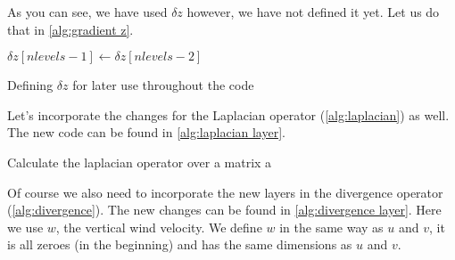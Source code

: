 As you can see, we have used $\delta z$ however, we have not defined it yet. Let us do that in \autoref{alg:gradient z}.

\begin{algorithm}[hbt]
    $\delta z[nlevels - 1] \leftarrow \delta z [nlevels - 2]$ \;
    \caption{Defining $\delta z$ for later use throughout the code}
    \label{alg:gradient z}
\end{algorithm}

Let's incorporate the changes for the Laplacian operator (\autoref{alg:laplacian}) as well. The new code can be found in \autoref{alg:laplacian layer}.

\begin{algorithm}[hbt]
    
     \;
    \caption{Calculate the laplacian operator over a matrix a}
    \label{alg:laplacian layer}
\end{algorithm}

Of course we also need to incorporate the new layers in the divergence operator (\autoref{alg:divergence}). The new changes can be found in \autoref{alg:divergence layer}. Here we use $w$, the 
vertical wind velocity. We define $w$ in the same way as $u$ and $v$, it is all zeroes (in the beginning) and has the same dimensions as $u$ and $v$.

